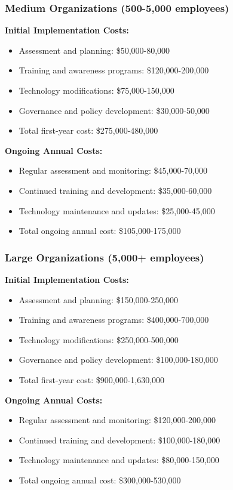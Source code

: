 \documentclass[11pt,a4paper]{article}
\begin{document}
\subsubsection{Medium Organizations (500-5,000 employees)}

\textbf{Initial Implementation Costs:}
\begin{itemize}
\item Assessment and planning: \$50,000-80,000
\item Training and awareness programs: \$120,000-200,000
\item Technology modifications: \$75,000-150,000
\item Governance and policy development: \$30,000-50,000
\item Total first-year cost: \$275,000-480,000
\end{itemize}

\textbf{Ongoing Annual Costs:}
\begin{itemize}
\item Regular assessment and monitoring: \$45,000-70,000
\item Continued training and development: \$35,000-60,000
\item Technology maintenance and updates: \$25,000-45,000
\item Total ongoing annual cost: \$105,000-175,000
\end{itemize}

\subsubsection{Large Organizations (5,000+ employees)}

\textbf{Initial Implementation Costs:}
\begin{itemize}
\item Assessment and planning: \$150,000-250,000
\item Training and awareness programs: \$400,000-700,000
\item Technology modifications: \$250,000-500,000
\item Governance and policy development: \$100,000-180,000
\item Total first-year cost: \$900,000-1,630,000
\end{itemize}

\textbf{Ongoing Annual Costs:}
\begin{itemize}
\item Regular assessment and monitoring: \$120,000-200,000
\item Continued training and development: \$100,000-180,000
\item Technology maintenance and updates: \$80,000-150,000
\item Total ongoing annual cost: \$300,000-530,000
\end{itemize}
\end{document}
